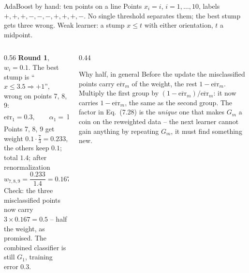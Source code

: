 \documentclass[10pt,aspectratio=169]{beamer}
\newcommand{\err}{\overline{\mathrm{err}}}
\begin{document}
\begin{frame}{AdaBoost by hand: ten points on a line}
\footnotesize
Points $x_i=i$, $i=1,\dots,10$, labels $+,+,+,-,-,-,+,+,+,-$.  No single
threshold separates them; the best stump gets three wrong.  Weak learner: a
stump $x\leq t$ with either orientation, $t$ a midpoint.

\begin{columns}[T]
\begin{column}{0.56\textwidth}
\textbf{Round 1}, $w_i=0.1$.  The best stump is ``$x\leq3.5\Rightarrow+1$'',
wrong on points 7, 8, 9:
\[
\err_1=0.3,\qquad \alpha_1=\log\frac{0.7}{0.3}=0.847,\qquad e^{\alpha_1}=\tfrac{7}{3}.
\]
Points 7, 8, 9 get weight $0.1\cdot\frac73=0.233$, the others keep $0.1$;
total $1.4$; after renormalization
\[
w_{7,8,9}=\frac{0.233}{1.4}=0.167,\qquad w_{\text{others}}=\frac{0.1}{1.4}=0.0714 .
\]
Check: the three misclassified points now carry $3\times0.167=0.5$ -- half
the weight, as promised.  The combined classifier is still $G_1$, training
error $0.3$.
\end{column}
\begin{column}{0.44\textwidth}
\begin{block}{Why half, in general}
Before the update the misclassified points carry $\err_m$ of the weight, the
rest $1-\err_m$.  Multiply the first group by $(1-\err_m)/\err_m$: it now
carries $1-\err_m$, the same as the second group.  The factor in Eq.\ (7.28)
is the \emph{unique} one that makes $G_m$ a coin on the reweighted data --
the next learner cannot gain anything by repeating $G_m$, it must find
something new.
\end{block}
\end{column}
\end{columns}
\end{frame}
\end{document}
